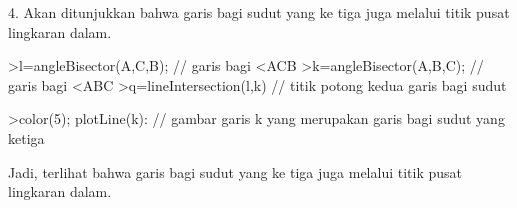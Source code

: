 \documentclass[12pt,arial,letterpaper]{book}
\begin{document}
\begin{eulercomment}
\begin{eulercomment}
\begin{eulercomment}
\begin{eulercomment}
\begin{eulercomment}
\begin{eulercomment}
\begin{eulercomment}
\begin{eulercomment}
\begin{eulercomment}
\begin{eulercomment}
\begin{eulercomment}
\begin{eulercomment}
\begin{eulercomment}
\begin{eulercomment}
\begin{eulercomment}
\begin{eulercomment}
\begin{eulercomment}
\begin{eulercomment}
\begin{eulercomment}
\begin{eulercomment}
\begin{eulercomment}
\begin{eulercomment}
\begin{eulercomment}
\begin{eulercomment}
\begin{eulercomment}
4. Akan ditunjukkan bahwa garis bagi sudut yang ke tiga juga melalui
titik pusat lingkaran dalam.
\end{eulercomment}
\begin{eulerprompt}
>l=angleBisector(A,C,B); // garis bagi <ACB
>k=angleBisector(A,B,C); // garis bagi <ABC
>q=lineIntersection(l,k) // titik potong kedua garis bagi sudut
\end{eulerprompt}
\begin{euleroutput}
  [0.86038,  0.86038]
\end{euleroutput}
\begin{eulerprompt}
>color(5); plotLine(k): // gambar garis k yang merupakan garis bagi sudut yang ketiga 
\end{eulerprompt}
\begin{eulercomment}
Jadi, terlihat bahwa garis bagi sudut yang ke tiga juga melalui titik
pusat lingkaran dalam.


\end{eulercomment}
\end{eulercomment}
\end{eulercomment}
\end{eulercomment}
\end{eulercomment}
\end{eulercomment}
\end{eulercomment}
\end{eulercomment}
\end{eulercomment}
\end{eulercomment}
\end{eulercomment}
\end{eulercomment}
\end{eulercomment}
\end{eulercomment}
\end{eulercomment}
\end{eulercomment}
\end{eulercomment}
\end{eulercomment}
\end{eulercomment}
\end{eulercomment}
\end{eulercomment}
\end{eulercomment}
\end{eulercomment}
\end{eulercomment}
\end{eulercomment}
\end{document}
